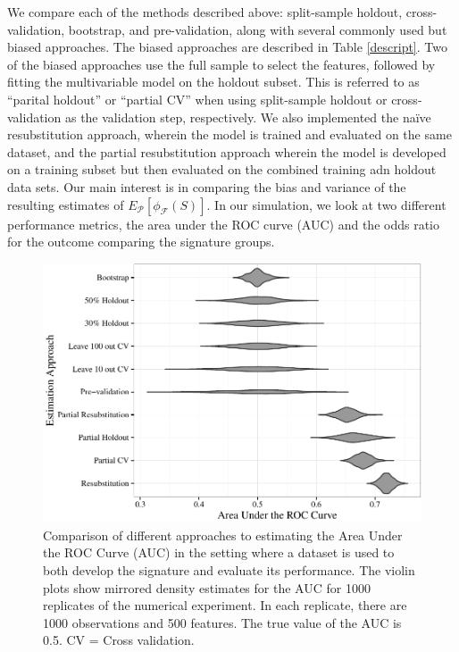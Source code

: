 \documentclass[11pt,]{article}
\begin{document}
We compare each of the methods described above: split-sample holdout,
cross-validation, bootstrap, and pre-validation, along with several
commonly used but biased approaches. The biased approaches are described
in Table \ref{descript}. Two of the biased approaches use the full
sample to select the features, followed by fitting the multivariable
model on the holdout subset. This is referred to as ``parital holdout''
or ``partial CV'' when using split-sample holdout or cross-validation as
the validation step, respectively. We also implemented the naïve
resubstitution approach, wherein the model is trained and evaluated on
the same dataset, and the partial resubstitution approach wherein the
model is developed on a training subset but then evaluated on the
combined training adn holdout data sets. Our main interest is in
comparing the bias and variance of the resulting estimates of
\(E_{\mathcal{P}}[\phi_{\mathcal{F}}(S)]\). In our simulation, we look
at two different performance metrics, the area under the ROC curve (AUC)
and the odds ratio for the outcome comparing the signature groups.

\begin{figure}[htbp]
\centering
\includegraphics{paper-revised_files/figure-latex/cvsims-1.pdf}
\caption{Comparison of different approaches to estimating the Area Under
the ROC Curve (AUC) in the setting where a dataset is used to both
develop the signature and evaluate its performance. The violin plots
show mirrored density estimates for the AUC for 1000 replicates of the
numerical experiment. In each replicate, there are 1000 observations and
500 features. The true value of the AUC is 0.5. CV = Cross validation.
\label{fig1}}
\end{figure}
\end{document}

